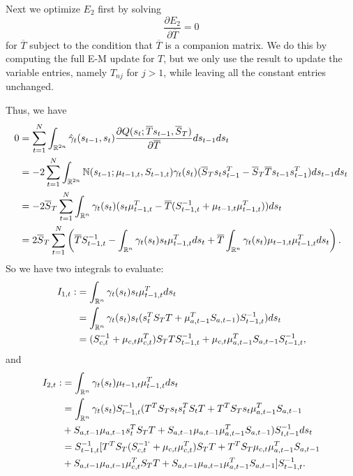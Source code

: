 \documentclass[12pt,leqno]{article}
\begin{document}
Next we optimize $E_2$ first by solving
$$
\frac{\partial{E_2}}{\partial{\overline{T}}} = 0
$$
for $\overline{T}$ subject to the condition that $\overline{T}$ is a companion matrix.  We do this
by computing the full E-M update for $T$, but we only use the result to update the variable entries,
namely $T_{nj}$ for $j > 1$, while leaving all the constant entries unchanged.

Thus, we have
\begin{equation}\label{T:1}
  \begin{split}
0 &= \sum_{t=1}^N\int_{{\mathbb R}^{2n}}\hat{\gamma}_t(s_{t-1},s_t)
\frac{\partial{Q(s_t;\overline{T}s_{t-1},\overline{S}_T)}}{\partial\overline{T}}ds_{t-1}ds_t \\
&= -2\sum_{t=1}^N\int_{{\mathbb R}^{2n}}{\mathbb N}(s_{t-1};\mu_{t-1,t},S_{t-1,t})\gamma_t(s_t)(\overline{S}_Ts_ts_{t-1}^T -
\overline{S}_T\overline{T}s_{t-1}s_{t-1}^T) ds_{t-1}ds_t \\
&= -2\overline{S}_T\sum_{t=1}^N\int_{{\mathbb R}^{n}}\gamma_t(s_t) (s_t\mu_{t-1,t}^T -
\overline{T}(S_{t-1,t}^{-1} + \mu_{t-1,t}\mu_{t-1,t}^T))ds_t \\
&= 2\overline{S}_T\sum_{t=1}^N\left(\overline{T}S_{t-1,t}^{-1} - \int_{{\mathbb R}^n}\gamma_t(s_t)s_t\mu_{t-1,t}^Tds_t +
\overline{T}\int_{{\mathbb R}^n}\gamma_t(s_t)\mu_{t-1,t}\mu_{t-1,t}^Tds_t\right).\\
  \end{split}
\end{equation}
So we have two integrals to evaluate:
\begin{equation}\label{I_1}
  \begin{split}
  I_{1,t} :&= \int_{{\mathbb R}^n}\gamma_t(s_t)s_t\mu_{t-1,t}^Tds_t \\
  &= \int_{{\mathbb R}^n}\gamma_t(s_t)s_t(s_t^TS_TT + \mu_{a,t-1}^TS_{a,t-1})S_{t-1,t}^{-1})ds_t \\
  &= (S_{c,t}^{-1} + \mu_{c,t}\mu_{c,t}^T)S_TTS_{t-1,t}^{-1} + \mu_{c,t}\mu_{a,t-1}^TS_{a,t-1}S_{t-1,t}^{-1},
  \end{split}
  \end{equation}
and
\begin{equation}\label{I_2}
  \begin{split}
  I_{2,t} :&= \int_{{\mathbb R}^n}\gamma_t(s_t)\mu_{t-1,t}\mu_{t-1,t}^Tds_t \\
  &= \int_{{\mathbb R}^n}\gamma_t(s_t)S_{t-1,t}^{-1}(T^TS_Ts_ts_t^TS_tT + T^TS_Ts_t\mu_{a,t-1}^TS_{a,t-1} \\
  &+ S_{a,t-1}\mu_{a,t-1}s_t^TS_TT + S_{a,t-1}\mu_{a,t-1}\mu_{a,t-1}^TS_{a,t-1}) S_{t,t-1}^{-1}ds_t \\
  &= S_{t-1,t}^{-1}[T^TS_T(S_{c,t}^{-1`}+\mu_{c,t}\mu_{c,t}^T)S_TT + T^TS_T\mu_{c,t}\mu_{a,t-1}^TS_{a,t-1} \\
  &+ S_{a,t-1}\mu_{a,t-1}\mu_{c,t}^TS_TT + S_{a,t-1}\mu_{a,t-1}\mu_{a,t-1}^TS_{a,t-1}]S_{t-1,t}^{-1}. \\
\end{split}
\end{equation}
\end{document}
